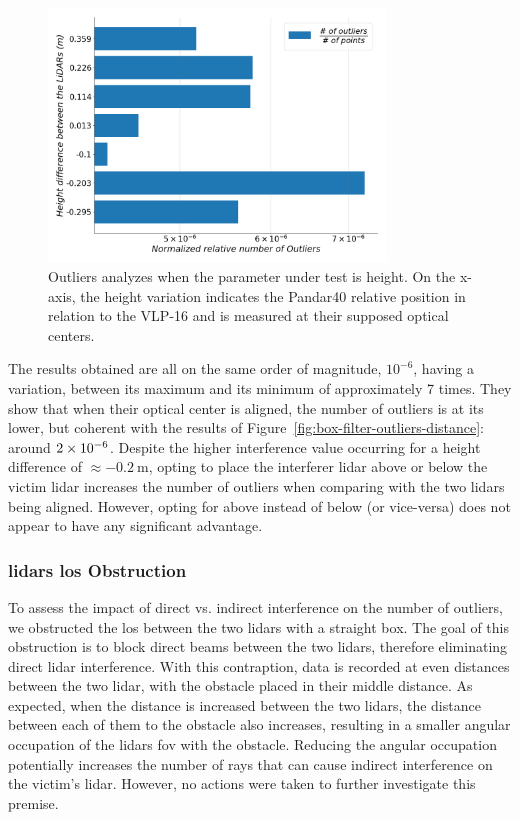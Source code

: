 \begin{figure}[!ht]
\centering
\includegraphics[width=0.8\textwidth]{img/lidar-interference/box-filtering/interference-box-filter-outliers-height.png}
\caption[Relative number of outliers when the height between the \acp{lidar} is varied on \ac{irislab}.]{Outliers analyzes when the parameter under test is height. On the x-axis, the height variation indicates the Pandar40 relative position in relation to the VLP-16 and is measured at their supposed optical centers.}
\label{fig:box-filter-outliers-height}
\end{figure}

The results obtained are all on the same order of magnitude, $10^{-6}$, having a variation, between its maximum and its minimum of approximately 7 times. They show that when their optical center is aligned, the number of outliers is at its lower, but coherent with the results of Figure~\ref{fig:box-filter-outliers-distance}: around $2\times 10^{-6}$. Despite the higher interference value occurring for a height difference of $\approx \SI{-0.2}{\meter}$, opting to place the interferer \ac{lidar} above or below the victim \ac{lidar} increases the number of outliers when comparing with the two \acp{lidar} being aligned. However, opting for above instead of below (or vice-versa) does not appear to have any significant advantage. 

\subsubsection{\acp{lidar} \ac{los} Obstruction}
To assess the impact of direct vs. indirect interference on the number of outliers, we obstructed the \acf{los} between the two \acp{lidar} with a straight box. The goal of this obstruction is to block direct beams between the two \acp{lidar}, therefore eliminating direct \ac{lidar} interference. With this contraption, data is recorded at even distances between the two \ac{lidar}, with the obstacle placed in their middle distance. As expected, when the distance is increased between the two \acp{lidar}, the distance between each of them to the obstacle also increases, resulting in a smaller angular occupation of the \acp{lidar} \ac{fov} with the obstacle. Reducing the angular occupation potentially increases the number of rays that can cause indirect interference on the victim's \ac{lidar}. However, no actions were taken to further investigate this premise.

